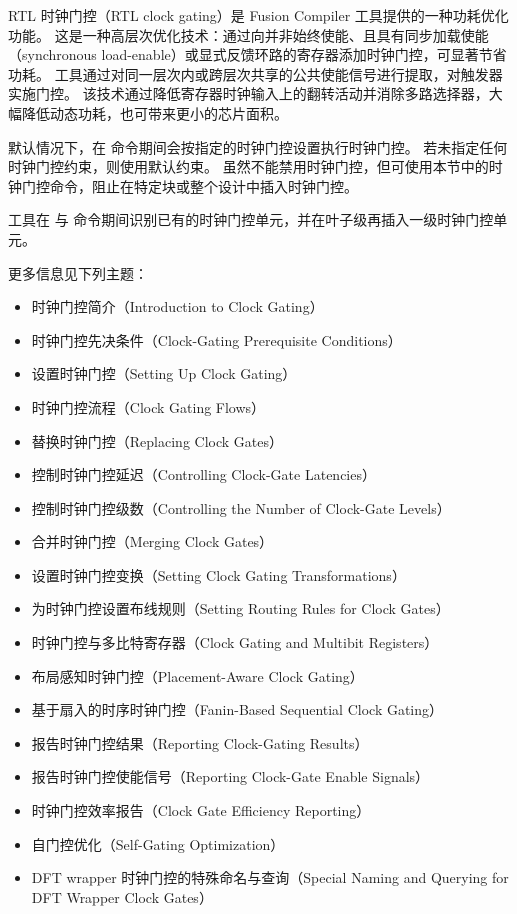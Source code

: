 \label{chap:cg}

RTL 时钟门控（RTL clock gating）是 Fusion Compiler 工具提供的一种功耗优化功能。
这是一种高层次优化技术：通过向并非始终使能、且具有同步加载使能（synchronous load-enable）或显式反馈环路的寄存器添加时钟门控，可显著节省功耗。
工具通过对同一层次内或跨层次共享的公共使能信号进行提取，对触发器实施门控。
该技术通过降低寄存器时钟输入上的翻转活动并消除多路选择器，大幅降低动态功耗，也可带来更小的芯片面积。

默认情况下，在  命令期间会按指定的时钟门控设置执行时钟门控。
若未指定任何时钟门控约束，则使用默认约束。
虽然不能禁用时钟门控，但可使用本节中的时钟门控命令，阻止在特定块或整个设计中插入时钟门控。

工具在  与  命令期间识别已有的时钟门控单元，并在叶子级再插入一级时钟门控单元。

更多信息见下列主题：
\begin{itemize}
  \item 时钟门控简介（Introduction to Clock Gating）
  \item 时钟门控先决条件（Clock-Gating Prerequisite Conditions）
  \item 设置时钟门控（Setting Up Clock Gating）
  \item 时钟门控流程（Clock Gating Flows）
  \item 替换时钟门控（Replacing Clock Gates）
  \item 控制时钟门控延迟（Controlling Clock-Gate Latencies）
  \item 控制时钟门控级数（Controlling the Number of Clock-Gate Levels）
  \item 合并时钟门控（Merging Clock Gates）
  \item 设置时钟门控变换（Setting Clock Gating Transformations）
  \item 为时钟门控设置布线规则（Setting Routing Rules for Clock Gates）
  \item 时钟门控与多比特寄存器（Clock Gating and Multibit Registers）
  \item 布局感知时钟门控（Placement-Aware Clock Gating）
  \item 基于扇入的时序时钟门控（Fanin-Based Sequential Clock Gating）
  \item 报告时钟门控结果（Reporting Clock-Gating Results）
  \item 报告时钟门控使能信号（Reporting Clock-Gate Enable Signals）
  \item 时钟门控效率报告（Clock Gate Efficiency Reporting）
  \item 自门控优化（Self-Gating Optimization）
  \item DFT wrapper 时钟门控的特殊命名与查询（Special Naming and Querying for DFT Wrapper Clock Gates）
\end{itemize}


